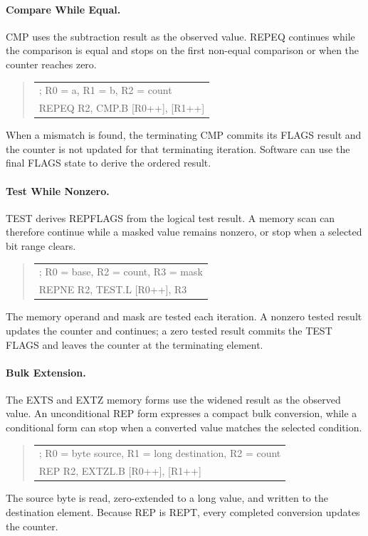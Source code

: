 \paragraph{Compare While Equal.}
CMP uses the subtraction result as the observed value. REPEQ continues while the comparison is equal and stops
on the first non-equal comparison or when the counter reaches zero.

\begin{quote}
\begingroup\small\ttfamily
\begin{tabular}{@{}l@{}}
; R0 = a, R1 = b, R2 = count\\
REPEQ R2, CMP.B [R0++], [R1++]\\
\end{tabular}
\endgroup
\end{quote}

When a mismatch is found, the terminating CMP commits its FLAGS result and the counter is not updated for that
terminating iteration. Software can use the final FLAGS state to derive the ordered result.

\paragraph{Test While Nonzero.}
TEST derives REPFLAGS from the logical test result. A memory scan can therefore continue while a masked value
remains nonzero, or stop when a selected bit range clears.

\begin{quote}
\begingroup\small\ttfamily
\begin{tabular}{@{}l@{}}
; R0 = base, R2 = count, R3 = mask\\
REPNE R2, TEST.L [R0++], R3\\
\end{tabular}
\endgroup
\end{quote}

The memory operand and mask are tested each iteration. A nonzero tested result updates the counter and
continues; a zero tested result commits the TEST FLAGS and leaves the counter at the terminating element.

\paragraph{Bulk Extension.}
The EXTS and EXTZ memory forms use the widened result as the observed value. An unconditional REP form expresses
a compact bulk conversion, while a conditional form can stop when a converted value matches the selected
condition.

\begin{quote}
\begingroup\small\ttfamily
\begin{tabular}{@{}l@{}}
; R0 = byte source, R1 = long destination, R2 = count\\
REP R2, EXTZL.B [R0++], [R1++]\\
\end{tabular}
\endgroup
\end{quote}

The source byte is read, zero-extended to a long value, and written to the destination element. Because REP is
REPT, every completed conversion updates the counter.
